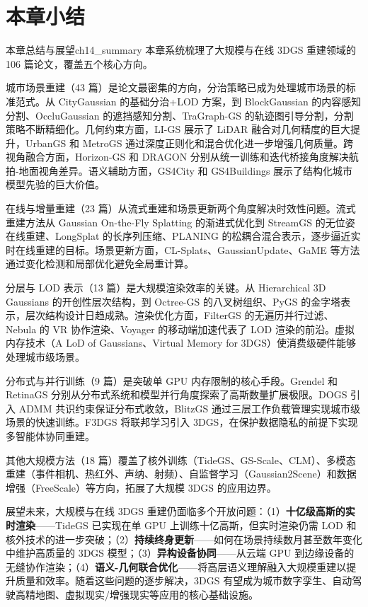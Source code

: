 


\section*{本章小结}
\label{sec:14_summary}

\begin{futurebox}{本章总结与展望}{ch14_summary}
本章系统梳理了大规模与在线 3DGS 重建领域的 106 篇论文，覆盖五个核心方向。

城市场景重建（43 篇）是论文最密集的方向，分治策略已成为处理城市场景的标准范式。从 CityGaussian 的基础分治+LOD 方案，到 BlockGaussian 的内容感知分割、OccluGaussian 的遮挡感知分割、TraGraph-GS 的轨迹图引导分割，分割策略不断精细化。几何约束方面，LI-GS 展示了 LiDAR 融合对几何精度的巨大提升，UrbanGS 和 MetroGS 通过深度正则化和混合优化进一步增强几何质量。跨视角融合方面，Horizon-GS 和 DRAGON 分别从统一训练和迭代桥接角度解决航拍-地面视角差异。语义辅助方面，GS4City 和 GS4Buildings 展示了结构化城市模型先验的巨大价值。

在线与增量重建（23 篇）从流式重建和场景更新两个角度解决时效性问题。流式重建方法从 Gaussian On-the-Fly Splatting 的渐进式优化到 StreamGS 的无位姿在线重建、LongSplat 的长序列压缩、PLANING 的松耦合混合表示，逐步逼近实时在线重建的目标。场景更新方面，CL-Splats、GaussianUpdate、GaME 等方法通过变化检测和局部优化避免全局重计算。

分层与 LOD 表示（13 篇）是大规模渲染效率的关键。从 Hierarchical 3D Gaussians 的开创性层次结构，到 Octree-GS 的八叉树组织、PyGS 的金字塔表示，层次结构设计日趋成熟。渲染优化方面，FilterGS 的无遍历并行过滤、Nebula 的 VR 协作渲染、Voyager 的移动端加速代表了 LOD 渲染的前沿。虚拟内存技术（A LoD of Gaussians、Virtual Memory for 3DGS）使消费级硬件能够处理城市级场景。

分布式与并行训练（9 篇）是突破单 GPU 内存限制的核心手段。Grendel 和 RetinaGS 分别从分布式系统和模型并行角度探索了高斯数量扩展极限。DOGS 引入 ADMM 共识约束保证分布式收敛，BlitzGS 通过三层工作负载管理实现城市级场景的快速训练。F3DGS 将联邦学习引入 3DGS，在保护数据隐私的前提下实现多智能体协同重建。

其他大规模方法（18 篇）覆盖了核外训练（TideGS、GS-Scale、CLM）、多模态重建（事件相机、热红外、声纳、射频）、自监督学习（Gaussian2Scene）和数据增强（FreeScale）等方向，拓展了大规模 3DGS 的应用边界。

展望未来，大规模与在线 3DGS 重建仍面临多个开放问题：（1）\textbf{十亿级高斯的实时渲染}——TideGS 已实现在单 GPU 上训练十亿高斯，但实时渲染仍需 LOD 和核外技术的进一步突破；（2）\textbf{持续终身更新}——如何在场景持续数月甚至数年变化中维护高质量的 3DGS 模型；（3）\textbf{异构设备协同}——从云端 GPU 到边缘设备的无缝协作渲染；（4）\textbf{语义-几何联合优化}——将高层语义理解融入大规模重建以提升质量和效率。随着这些问题的逐步解决，3DGS 有望成为城市数字孪生、自动驾驶高精地图、虚拟现实/增强现实等应用的核心基础设施。
\end{futurebox}
